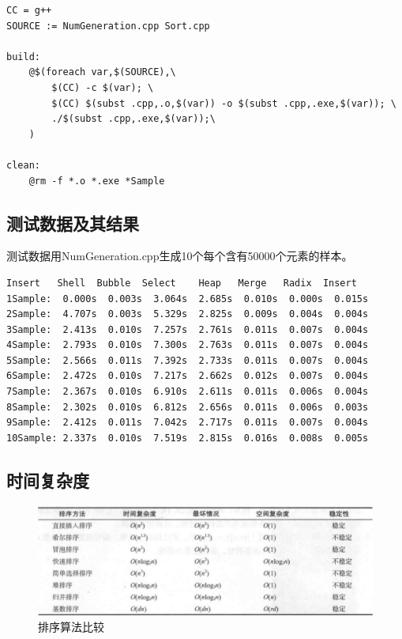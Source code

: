 \documentclass[a4paper,11pt,UTF8]{ctexart}
\begin{document}
\begin{lstlisting}[caption=Makefile,captionpos=b]
CC = g++
SOURCE := NumGeneration.cpp Sort.cpp

build:
    @$(foreach var,$(SOURCE),\
        $(CC) -c $(var); \
        $(CC) $(subst .cpp,.o,$(var)) -o $(subst .cpp,.exe,$(var)); \
        ./$(subst .cpp,.exe,$(var));\
    )

clean:
    @rm -f *.o *.exe *Sample
\end{lstlisting}

\subsection{测试数据及其结果}

测试数据用NumGeneration.cpp生成10个每个含有50000个元素的样本。

\begin{lstlisting}[caption=结果,captionpos=b]
          Insert   Shell  Bubble  Select    Heap   Merge   Radix  Insert
1Sample:  0.000s  0.003s  3.064s  2.685s  0.010s  0.000s  0.015s
2Sample:  4.707s  0.003s  5.329s  2.825s  0.009s  0.004s  0.004s
3Sample:  2.413s  0.010s  7.257s  2.761s  0.011s  0.007s  0.004s
4Sample:  2.793s  0.010s  7.300s  2.763s  0.011s  0.007s  0.004s
5Sample:  2.566s  0.011s  7.392s  2.733s  0.011s  0.007s  0.004s
6Sample:  2.472s  0.010s  7.217s  2.662s  0.012s  0.007s  0.004s
7Sample:  2.367s  0.010s  6.910s  2.611s  0.011s  0.006s  0.004s
8Sample:  2.302s  0.010s  6.812s  2.656s  0.011s  0.006s  0.003s
9Sample:  2.412s  0.011s  7.042s  2.717s  0.011s  0.007s  0.004s
10Sample: 2.337s  0.010s  7.519s  2.815s  0.016s  0.008s  0.005s
\end{lstlisting}

\subsection{时间复杂度}

\begin{figure}[htbp] %
    \centering
    \includegraphics[width=13cm]{3.jpg}
    \caption{排序算法比较}
\end{figure}
\end{document}

